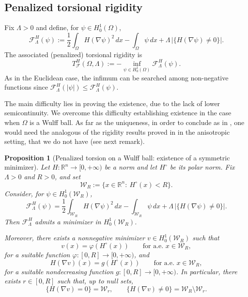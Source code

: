 \documentclass[oneside,a4paper,12pt,notitlepage]{article}
\newtheorem{proposition}[theorem]{Proposition}
\theoremstyle{definition}
\newcommand{\R}{\mathbb{R}}
\newcommand{\W}{\mathcal{W}}
\begin{document}
\subsection{Penalized torsional rigidity}

Fix $\Lambda>0$ and define, for $\psi\in H_0^1(\Omega)$,
\begin{equation}\label{eq:F_Lambda_aniso}
\mathcal F^H_{\Lambda}(\psi)
:=\frac12\int_{\Omega} H(\nabla \psi)^2\,dx-\int_{\Omega}\psi\,dx
+\Lambda\,\big|\{H(\nabla\psi)\neq 0\}\big|.
\end{equation}
The associated (penalized) torsional rigidity is
\begin{equation}\label{eq:TF_aniso_def}
T_{\mathcal F}^H(\Omega,\Lambda):=-\inf_{\psi\in H_0^1(\Omega)}\mathcal F^H_{\Lambda}(\psi).
\end{equation}
As in the Euclidean case, the infimum can be searched among non-negative functions since
$\mathcal F^H_\Lambda(|\psi|)\le \mathcal F^H_\Lambda(\psi)$. 


 The main difficulty lies in proving the existence, due to the lack of lower semicontinuity. We overcome this difficulty establishing existence in the case when $\Omega$ is a Wulff ball.  As far as the uniqueness, in order to conclude as in \cite{AGNT24}, one would need the analogous of the rigidity results proved in \cite{mercaldo_remark} in the anisotropic setting, that we do not have (see next remark). 

\begin{proposition}[Penalized torsion on a Wulff ball: existence of a symmetric minimizer]
\label{prop:TF_aniso_wulff_exist_unique}
Let $H:\R^n\to[0,+\infty)$ be a norm and let $H^\circ$ be its polar norm.
Fix $\Lambda>0$ and $R>0$, and set
\[
\W_R:=\{x\in\R^n:\ H^\circ(x)<R\}.
\]
Consider, for $\psi\in H_0^1(\W_R)$,
\[
\mathcal F^H_{\Lambda}(\psi)
=\frac12\int_{\W_R} H(\nabla \psi)^2\,dx-\int_{\W_R}\psi\,dx
+\Lambda\,\big|\{H(\nabla\psi)\neq 0\}\big|.
\]
Then $\mathcal F^H_\Lambda$ admits a minimizer in $H_0^1(\W_R)$.

Moreover, there exists a nonnegative minimizer $v\in H_0^1(\W_R)$ such that
\[
v(x)=\varphi(H^\circ(x))\qquad\text{for a.e. }x\in\W_R,
\]
for a suitable function $\varphi:[0,R]\to[0,+\infty)$, and
\[
H(\nabla v)(x)=g(H^\circ(x))\qquad\text{for a.e. }x\in\W_R,
\]
for a suitable nondecreasing function $g:[0,R]\to[0,+\infty)$.
In particular, there exists $r\in[0,R]$ such that, up to null sets,
\[
\{H(\nabla v)=0\}=\W_r,
\qquad
\{H(\nabla v)\neq 0\}=\W_R\setminus\W_r.
\]
\end{proposition}
\end{document}
